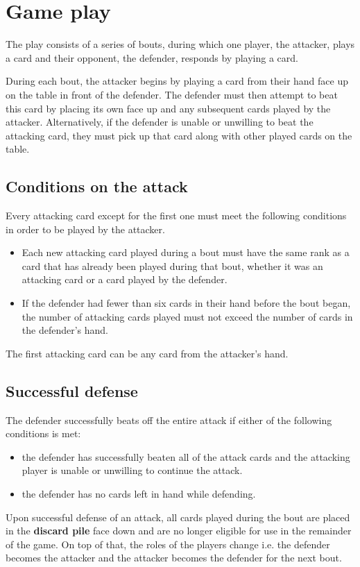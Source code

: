 \section{Game play}
The play consists of a series of bouts, during which one player, the attacker, plays a card and their opponent, the defender, responds by playing a card. 

During each bout, the attacker begins by playing a card from their hand face up on the table in front of the defender. The defender must then attempt to beat this card by placing its own face up and any subsequent cards played by the attacker. Alternatively, if the defender is unable or unwilling to beat the attacking card, they must pick up that card along with other played cards on the table.

\subsection{Conditions on the attack}
Every attacking card except for the first one must meet the following conditions in order to be played by the attacker.

\begin{itemize}
    \item Each new attacking card played during a bout must have the same rank as a card that has already been played during that bout, whether it was an attacking card or a card played by the defender.
    \item If the defender had fewer than six cards in their hand before the bout began, the number of attacking cards played must not exceed the number of cards in the defender's hand.
\end{itemize}
The first attacking card can be any card from the attacker's hand.

\subsection{Successful defense}
The defender successfully beats off the entire attack if either of the following conditions is met:
\begin{itemize}
    \item the defender has successfully beaten all of the attack cards and the attacking player is unable or unwilling to continue the attack.
    \item the defender has no cards left in hand while defending.
\end{itemize}

Upon successful defense of an attack, all cards played during the bout are placed in the \textbf{discard pile} face down and are no longer eligible for use in the remainder of the game. On top of that, the roles of the players change i.e. the defender becomes the attacker and the attacker becomes the defender for the next bout.

